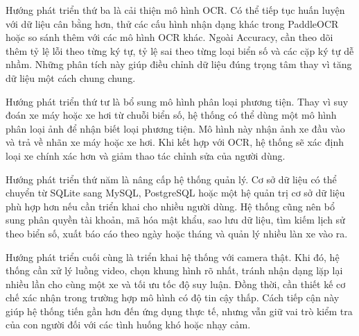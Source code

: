 \documentclass[13pt,a4paper]{report}
\begin{document}
Hướng phát triển thứ ba là cải thiện mô hình OCR. Có thể tiếp tục huấn luyện với dữ liệu cân bằng hơn, thử các cấu hình nhận dạng khác trong PaddleOCR hoặc so sánh thêm với các mô hình OCR khác. Ngoài Accuracy, cần theo dõi thêm tỷ lệ lỗi theo từng ký tự, tỷ lệ sai theo từng loại biển số và các cặp ký tự dễ nhầm. Những phân tích này giúp điều chỉnh dữ liệu đúng trọng tâm thay vì tăng dữ liệu một cách chung chung.

Hướng phát triển thứ tư là bổ sung mô hình phân loại phương tiện. Thay vì suy đoán xe máy hoặc xe hơi từ chuỗi biển số, hệ thống có thể dùng một mô hình phân loại ảnh để nhận biết loại phương tiện. Mô hình này nhận ảnh xe đầu vào và trả về nhãn xe máy hoặc xe hơi. Khi kết hợp với OCR, hệ thống sẽ xác định loại xe chính xác hơn và giảm thao tác chỉnh sửa của người dùng.

Hướng phát triển thứ năm là nâng cấp hệ thống quản lý. Cơ sở dữ liệu có thể chuyển từ SQLite sang MySQL, PostgreSQL hoặc một hệ quản trị cơ sở dữ liệu phù hợp hơn nếu cần triển khai cho nhiều người dùng. Hệ thống cũng nên bổ sung phân quyền tài khoản, mã hóa mật khẩu, sao lưu dữ liệu, tìm kiếm lịch sử theo biển số, xuất báo cáo theo ngày hoặc tháng và quản lý nhiều làn xe vào ra.

Hướng phát triển cuối cùng là triển khai hệ thống với camera thật. Khi đó, hệ thống cần xử lý luồng video, chọn khung hình rõ nhất, tránh nhận dạng lặp lại nhiều lần cho cùng một xe và tối ưu tốc độ suy luận. Đồng thời, cần thiết kế cơ chế xác nhận trong trường hợp mô hình có độ tin cậy thấp. Cách tiếp cận này giúp hệ thống tiến gần hơn đến ứng dụng thực tế, nhưng vẫn giữ vai trò kiểm tra của con người đối với các tình huống khó hoặc nhạy cảm.
\end{document}
